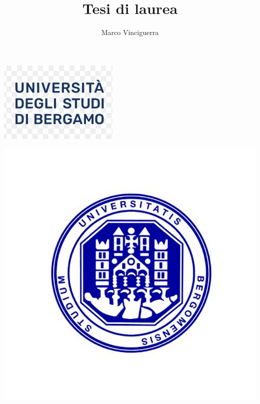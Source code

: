 \documentclass{article}
\author{Marco Vinciguerra}
\title{Tesi di laurea}
\date{}
\begin{document}
\begin{flushright}
    \includegraphics[scale=0.4]{logo.PNG}

    \includegraphics[scale=0.1]{UniBg-logo.jpg}
\end{flushright}

\maketitle
\end{document}
